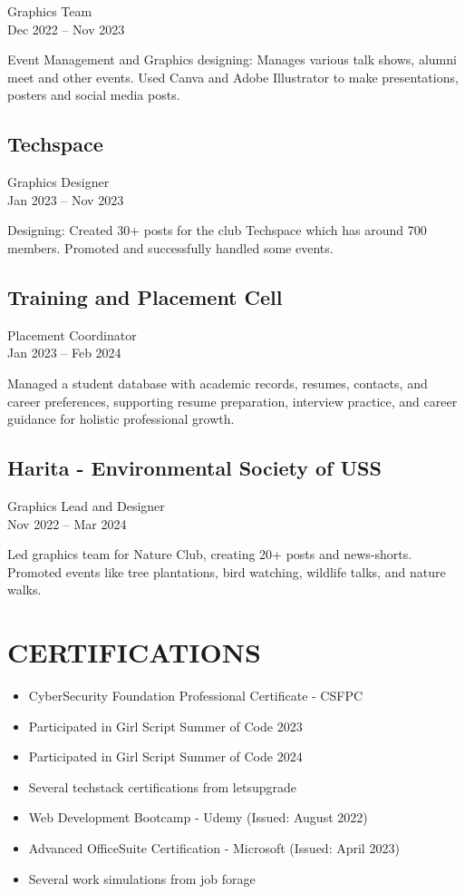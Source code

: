 \documentclass{article}
\begin{document}
Graphics Team \\
Dec 2022 -- Nov 2023

Event Management and Graphics designing: Manages various talk shows, alumni meet and other events. Used Canva and Adobe Illustrator to make presentations, posters and social media posts.

\subsection*{Techspace}

Graphics Designer \\
Jan 2023 -- Nov 2023

Designing: Created 30+ posts for the club Techspace which has around 700 members. Promoted and successfully handled some events.

\subsection*{Training and Placement Cell}

Placement Coordinator \\
Jan 2023 -- Feb 2024

Managed a student database with academic records, resumes, contacts, and career preferences, supporting resume preparation, interview practice, and career guidance for holistic professional growth.

\subsection*{Harita - Environmental Society of USS}

Graphics Lead and Designer \\
Nov 2022 -- Mar 2024

Led graphics team for Nature Club, creating 20+ posts and news-shorts. Promoted events like tree plantations, bird watching, wildlife talks, and nature walks.

\section*{CERTIFICATIONS}

\begin{itemize}[leftmargin=*]
    \item CyberSecurity Foundation Professional Certificate - CSFPC
    \item Participated in Girl Script Summer of Code 2023
    \item Participated in Girl Script Summer of Code 2024
    \item Several techstack certifications from letsupgrade
    \item Web Development Bootcamp - Udemy (Issued: August 2022)
    \item Advanced OfficeSuite Certification - Microsoft (Issued: April 2023)
    \item Several work simulations from job forage
\end{itemize}
\end{document}
